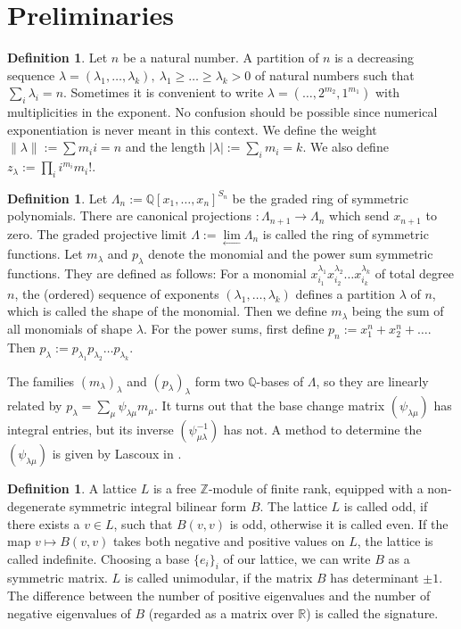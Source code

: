 \documentclass{amsart}
\newcommand{\coloneqq}{:=}
\newcommand{\IR}{\mathbb{R}}
\newcommand{\IQ}{\mathbb{Q}}
\newcommand{\IZ}{\mathbb{Z}}
\theoremstyle{plain}
\theoremstyle{definition}
\newtheorem{definition}[theorem]{Definition}
\theoremstyle{remark}
\begin{document}
\section{Preliminaries}
\begin{definition}
Let $n$ be a natural number. A partition of $n$ is a decreasing sequence $\lambda = (\lambda_1,\ldots,\lambda_k),\ \lambda_1\geq\ldots\geq\lambda_k>0$ of natural numbers such that $\sum_i \lambda_i =n$. Sometimes it is convenient to write $\lambda = (\ldots,2^{m_2},1^{m_1})$ with multiplicities in the exponent. No confusion should be possible since numerical exponentiation is never meant in this context. We define the weight $\|\lambda\| :=\sum m_i i =n$ and the length $|\lambda| := \sum_i m_i =k$. We also define $z_\lambda \coloneqq\prod_i i^{m_i} m_i!$. 
\end{definition}
\begin{definition} \label{SymFun}
Let $\Lambda_n := \IQ[x_1,\ldots,x_n]^{S_n}$ be the graded ring of symmetric polynomials. There are canonical projections $: \Lambda_{n+1}\rightarrow\Lambda_n$ which send $x_{n+1}$ to zero. The graded projective limit
$\Lambda:=\lim\limits_{\leftarrow}\Lambda_n$ is called the ring of symmetric functions.
Let $m_\lambda$ and $p_\lambda$ denote the monomial and the power sum symmetric functions. They are defined as follows: For a monomial $x_{i_1}^{\lambda_1}x_{i_2}^{\lambda_2}\ldots x_{i_k}^{\lambda_k}$ of total degree $n$, the (ordered) sequence of exponents $(\lambda_1,\ldots,\lambda_k)$ defines a partition $\lambda$ of $n$, which is called the shape of the monomial. Then we define $m_\lambda$ being the sum of all monomials of shape $\lambda$. For the power sums, first define $p_n := x_1^n + x_2^n + \ldots$. Then $p_\lambda := p_{\lambda_1}p_{\lambda_2}\ldots p_{\lambda_k}$.

The families $(m_\lambda)_\lambda$ and $(p_\lambda)_\lambda$ form two $\IQ$-bases of $\Lambda$, so they are linearly related by $p_\lambda = \sum_{\mu} \psi_{\lambda\mu}m_\mu$. It turns out that the base change matrix $(\psi_{\lambda\mu})$ has integral entries, but its inverse $(\psi_{\mu\lambda}^{-1})$ has not. A method to determine the $(\psi_{\lambda\mu})$ is given by Lascoux in \cite[Sect. 3.7]{Lascoux}.
\end{definition}
\begin{definition}
A lattice $L$ is a free $\IZ$-module of finite rank, equipped with a non-degenerate symmetric integral bilinear form $B$. The lattice $L$ is called odd, if there exists a $v\in L$, such that $B(v,v)$ is odd, otherwise it is called even. 
If the map $v \mapsto B(v,v)$ takes both negative and positive values on $L$, the lattice is called indefinite. 
Choosing a base $\{e_i\}_i$ of our lattice, we can write $B$ as a symmetric matrix. $L$ is called unimodular, if the matrix $B$ has determinant $\pm 1$. 
The difference between the number of positive eigenvalues and the number of negative eigenvalues of $B$ (regarded as a matrix over $\IR$) is called the signature.
\end{definition}
\end{document}

